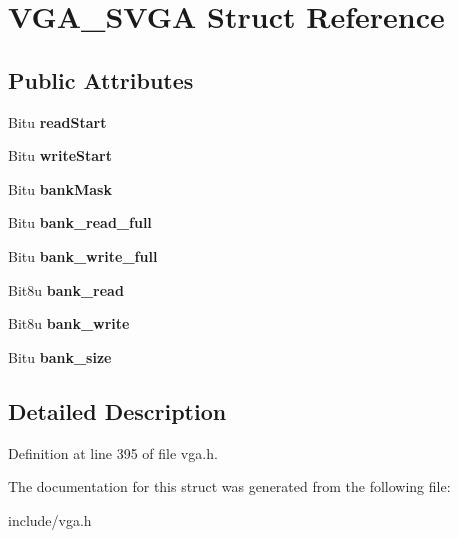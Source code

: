 \hypertarget{structVGA__SVGA}{\section{V\-G\-A\-\_\-\-S\-V\-G\-A Struct Reference}
\label{structVGA__SVGA}
}
\subsection*{Public Attributes}
\begin{DoxyCompactItemize}
\item 
\hypertarget{structVGA__SVGA_a12feba28b67c048513e66e201fac71dc}{Bitu {\bfseries read\-Start}}\label{structVGA__SVGA_a12feba28b67c048513e66e201fac71dc}

\item 
\hypertarget{structVGA__SVGA_a6dd88ed646507e88dec8ea6f36168810}{Bitu {\bfseries write\-Start}}\label{structVGA__SVGA_a6dd88ed646507e88dec8ea6f36168810}

\item 
\hypertarget{structVGA__SVGA_ac754dc12435255d72973c78b3130f611}{Bitu {\bfseries bank\-Mask}}\label{structVGA__SVGA_ac754dc12435255d72973c78b3130f611}

\item 
\hypertarget{structVGA__SVGA_a709b930e64d2c6a7f97f2a707a8c6baa}{Bitu {\bfseries bank\-\_\-read\-\_\-full}}\label{structVGA__SVGA_a709b930e64d2c6a7f97f2a707a8c6baa}

\item 
\hypertarget{structVGA__SVGA_ab222686ed91393c5f22fcbc2683a9afb}{Bitu {\bfseries bank\-\_\-write\-\_\-full}}\label{structVGA__SVGA_ab222686ed91393c5f22fcbc2683a9afb}

\item 
\hypertarget{structVGA__SVGA_a97458414e7c3e11d66fe7a04442ee044}{Bit8u {\bfseries bank\-\_\-read}}\label{structVGA__SVGA_a97458414e7c3e11d66fe7a04442ee044}

\item 
\hypertarget{structVGA__SVGA_ad9e4750a5b4addc6f5b5bd332cec147f}{Bit8u {\bfseries bank\-\_\-write}}\label{structVGA__SVGA_ad9e4750a5b4addc6f5b5bd332cec147f}

\item 
\hypertarget{structVGA__SVGA_a3182c5e72fb68b0c125e9f350de5a2e3}{Bitu {\bfseries bank\-\_\-size}}\label{structVGA__SVGA_a3182c5e72fb68b0c125e9f350de5a2e3}

\end{DoxyCompactItemize}


\subsection{Detailed Description}


Definition at line 395 of file vga.\-h.



The documentation for this struct was generated from the following file\-:\begin{DoxyCompactItemize}
\item 
include/vga.\-h\end{DoxyCompactItemize}
